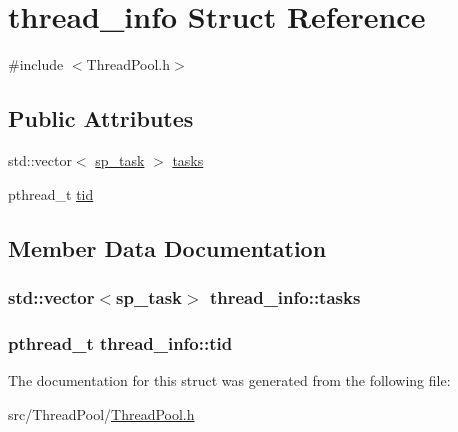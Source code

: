 \hypertarget{structthread__info}{\section{thread\+\_\+info Struct Reference}
\label{structthread__info}
}


{\ttfamily \#include $<$Thread\+Pool.\+h$>$}

\subsection*{Public Attributes}
\begin{DoxyCompactItemize}
\item 
std\+::vector$<$ \hyperlink{structsp__task}{sp\+\_\+task} $>$ \hyperlink{structthread__info_ab826b056145ce7f96e26908fa7de6398}{tasks}
\item 
pthread\+\_\+t \hyperlink{structthread__info_ae81f5cd44b9facefe8a6d35f872f5584}{tid}
\end{DoxyCompactItemize}


\subsection{Member Data Documentation}
\hypertarget{structthread__info_ab826b056145ce7f96e26908fa7de6398}{
\subsubsection[{tasks}]{\setlength{\rightskip}{0pt plus 5cm}std\+::vector$<${\bf sp\+\_\+task}$>$ thread\+\_\+info\+::tasks}}\label{structthread__info_ab826b056145ce7f96e26908fa7de6398}
\hypertarget{structthread__info_ae81f5cd44b9facefe8a6d35f872f5584}{
\subsubsection[{tid}]{\setlength{\rightskip}{0pt plus 5cm}pthread\+\_\+t thread\+\_\+info\+::tid}}\label{structthread__info_ae81f5cd44b9facefe8a6d35f872f5584}


The documentation for this struct was generated from the following file\+:\begin{DoxyCompactItemize}
\item 
src/\+Thread\+Pool/\hyperlink{_thread_pool_8h}{Thread\+Pool.\+h}\end{DoxyCompactItemize}
